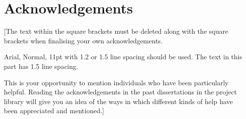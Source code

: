 \chapter*{Acknowledgements}
[The text within the square brackets must be deleted along with the square brackets when finalising your own acknowledgements. 

Arial, Normal, 11pt with 1.2 or 1.5 line spacing should be used. The text in this part has 1.5 line spacing.

This is your opportunity to mention individuals who have been particularly helpful. Reading the acknowledgements in the past dissertations in the project library will give you an idea of the ways in which different kinds of help have been appreciated and mentioned.]
